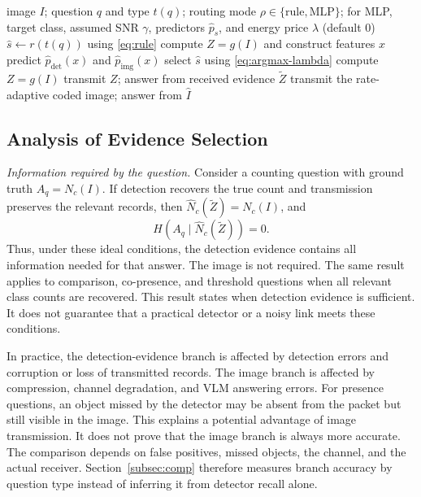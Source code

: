 \begin{algorithm}[t]
\caption{Question-conditioned evidence routing for one query}
\label{alg:selector}
\begin{algorithmic}[1]
\REQUIRE image $I$; question $q$ and type $t(q)$; routing mode
$\rho\in\{\mathrm{rule},\mathrm{MLP}\}$;
for MLP, target class, assumed SNR $\gamma$, predictors
$\widehat p_s$, and energy price $\lambda$ (default $0$)
  \STATE $\widehat s\leftarrow r(t(q))$ using \eqref{eq:rule}
\ELSE
  \STATE compute $Z=g(I)$ and construct features $x$
  \STATE predict $\widehat p_{\mathrm{det}}(x)$ and $\widehat p_{\mathrm{img}}(x)$
  \STATE select $\widehat s$ using \eqref{eq:argmax-lambda}
\ENDIF
{}
    \STATE compute $Z=g(I)$
  \ENDIF
  \STATE transmit $Z$; answer from received evidence $\widetilde Z$
\ELSE
  \STATE transmit the rate-adaptive coded image; answer from $\widehat I$
\ENDIF
\end{algorithmic}
\end{algorithm}

\subsection{Analysis of Evidence Selection}\label{sec:theory}

\emph{Information required by the question.}
Consider a counting question with ground truth $A_q=N_c(I)$.
If detection recovers the true count and transmission preserves the
relevant records, then
$\widehat N_c(\widetilde Z)=N_c(I)$, and
\begin{equation}
H\!\left(A_q\mid\widehat N_c(\widetilde Z)\right)=0.
\label{eq:count-sufficiency}
\end{equation}
Thus, under these ideal conditions, the detection evidence contains
all information needed for that answer. The image is not required.
The same result applies to comparison, co-presence, and
threshold questions when all relevant class counts are recovered.
This result states when detection evidence is sufficient. It does
not guarantee that a practical detector or a noisy link meets these
conditions.

In practice, the detection-evidence branch is affected by detection
errors and corruption or loss of transmitted records. The image
branch is affected by compression, channel degradation, and VLM
answering errors. For presence questions, an object missed by the
detector may be absent from the packet but still visible in the
image. This explains a potential advantage of
image transmission. It does not prove that the image branch is
always more accurate. The comparison depends on false positives, missed
objects, the channel, and the actual receiver. Section~\ref{subsec:comp}
therefore measures branch accuracy by question type instead of
inferring it from detector recall alone.

